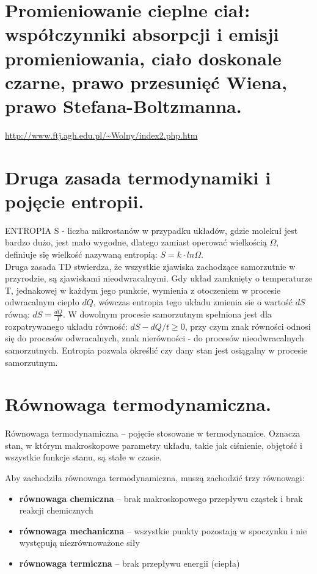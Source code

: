 \documentclass{article}
\begin{document}
\section{Promieniowanie cieplne ciał: współczynniki absorpcji i emisji promieniowania, ciało doskonale czarne, prawo przesunięć Wiena, prawo Stefana-Boltzmanna.}

\url{http://www.ftj.agh.edu.pl/~Wolny/index2.php.htm}

\section{Druga zasada termodynamiki i pojęcie entropii.}

ENTROPIA S - liczba mikrostanów w przypadku układów, gdzie molekuł jest bardzo dużo, jest mało wygodne, dlatego zamiast operować wielkością $\Omega$, definiuje się wielkość nazywaną entropią: $S=k\cdot ln\Omega$.\\
Druga zasada TD stwierdza, że wszystkie zjawiska zachodzące samorzutnie w przyrodzie, są zjawiskami nieodwracalnymi. Gdy układ zamknięty o temperaturze T, jednakowej w każdym jego punkcie, wymienia z otoczeniem w procesie odwracalnym ciepło $dQ$, wówczas entropia tego układu zmienia sie o wartość $dS$ równą: $dS = \frac{dQ}{T}$. W dowolnym procesie samorzutnym spełniona jest dla rozpatrywanego układu równość: $dS - dQ/t \geq 0$, przy czym znak równości odnosi się do procesów odwracalnych, znak nierówności - do procesów nieodwracalnych samorzutnych. Entropia pozwala określić czy dany stan jest osiągalny w procesie samorzutnym. 

\section{Równowaga termodynamiczna.}

Równowaga termodynamiczna – pojęcie stosowane w termodynamice. Oznacza stan, w którym makroskopowe parametry układu, takie jak ciśnienie, objętość i wszystkie funkcje stanu, są stałe w czasie.

Aby zachodziła równowaga termodynamiczna, muszą zachodzić trzy równowagi:
\begin{itemize}
    \item \textbf{równowaga chemiczna} -- brak makroskopowego przepływu cząstek i brak reakcji chemicznych
    \item \textbf{równowaga mechaniczna} -- wszystkie punkty pozostają w spoczynku i nie występują niezrównoważone siły
    \item \textbf{równowaga termiczna} -- brak przepływu energii (ciepła)
\end{itemize}
\end{document}
